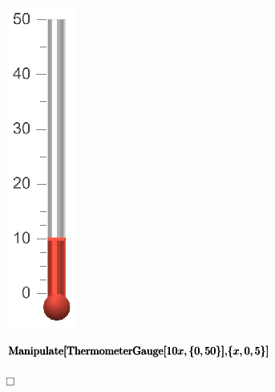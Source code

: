 \documentclass{article}
\begin{document}
\includegraphics{WLG_gr19.eps}

\begin{doublespace}
\noindent\(\pmb{\text{Manipulate}[}\\
\pmb{\text{ThermometerGauge}[10x,\{0,50\}],}\\
\pmb{\{x,0,5\}]}\)
\end{doublespace}

\begin{doublespace}
\noindent\(\fbox{$$}\)
\end{doublespace}

\begin{doublespace}
\noindent\(\pmb{\text{}}\)
\end{doublespace}

\begin{doublespace}
\noindent\(\pmb{\text{}}\)
\end{doublespace}
\end{document}
